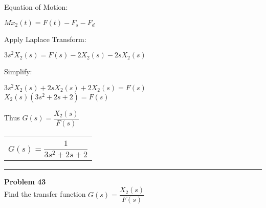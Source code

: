 \documentclass[11pt,letterpaper]{article}
\begin{document}
Equation of Motion:\\
\begin{center}
	$M\ddot{x}_2(t)=F(t)-F_s-F_d$\\[12pt]
\end{center}
Apply Laplace Transform:\\
\begin{center}
	$3s^2X_2(s)=F(s)-2X_2(s)-2sX_2(s)$\\
\end{center}
Simplify:\\
\begin{center}
	$3s^2X_2(s)+2sX_2(s)+2X_2(s)=F(s)$\\[12pt]
	$X_2(s)(3s^2+2s+2)=F(s)$\\[12pt]
\end{center}
Thus $G(s)=\dfrac{X_2(s)}{F(s)}$\\
\begin{center}
	\begin{tabular}{|c|}
		\hline \\
		$G(s)=\dfrac{1}{3s^2+2s+2}$\\[12pt]
		\hline
	\end{tabular}	
\end{center}

\clearpage

\rule{\textwidth}{1pt}
\textbf{Problem 43}\\
Find the transfer function $G(s)=\dfrac{X_2(s)}{F(s)}$\\
\end{document}
